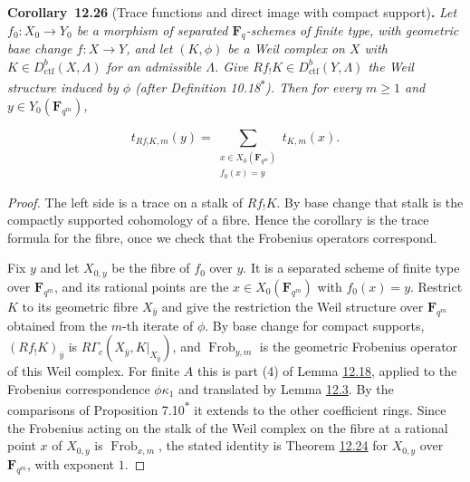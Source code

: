 \documentclass[11pt]{article}
\newenvironment{bpstatement}[2]{\par\addvspace{0.6\baselineskip}\noindent\textbf{#1}#2\textbf{.}\enspace\ignorespaces}
  {\par\addvspace{0.4\baselineskip}}
\newenvironment{bpstatementit}[2]{\begin{bpstatement}{#1}{#2}\itshape\ignorespaces}{\end{bpstatement}}
\newcommand{\bpout}[1]{#1\textsuperscript{\hyperlink{bp-outside}{\ensuremath{\ast}}}}
\begin{document}
\label{bp80}%
\begin{bpstatementit}{Corollary~12.26}{ (Trace functions and direct image with compact support)}
Let \(f_0:X_0\to Y_0\) be a morphism of separated \(\mathbf F_q\)-schemes of finite type, with geometric base change \(f:X\to Y\), and let \((K,\phi)\) be a Weil complex on \(X\) with \(K\in D^b_{\mathrm{ctf}}(X,\Lambda)\) for an admissible \(\Lambda\). Give \(Rf_!K\in D^b_{\mathrm{ctf}}(Y,\Lambda)\) the Weil structure induced by \(\phi\) (after Definition \bpout{10.18}). Then for every \(m\geq1\) and \(y\in Y_0(\mathbf F_{q^m})\),

\[
t_{Rf_!K,m}(y)=\sum_{\substack{x\in X_0(\mathbf F_{q^m})\\ f_0(x)=y}}
t_{K,m}(x).
\]
\end{bpstatementit}

\begin{proof}[{Proof}]\label{bp81}%
The left side is a trace on a stalk of \(Rf_!K\). By base change that stalk is the compactly supported cohomology of a fibre. Hence the corollary is the trace formula for the fibre, once we check that the Frobenius operators correspond.

Fix \(y\) and let \(X_{0,y}\) be the fibre of \(f_0\) over \(y\). It is a separated scheme of finite type over \(\mathbf F_{q^m}\), and its rational points are the \(x\in X_0(\mathbf F_{q^m})\) with \(f_0(x)=y\). Restrict \(K\) to its geometric fibre \(X_{\bar y}\) and give the restriction the Weil structure over \(\mathbf F_{q^m}\) obtained from the \(m\)-th iterate of \(\phi\). By base change for compact supports, \((Rf_!K)_{\bar y}\) is \(R\Gamma_c(X_{\bar y},K|_{X_{\bar y}})\), and \(\operatorname{Frob}_{y,m}\) is the geometric Frobenius operator of this Weil complex. For finite \(A\) this is part (4) of Lemma \hyperref[bp55]{12.18}, applied to the Frobenius correspondence \(\phi\kappa_1\) and translated by Lemma \hyperref[bp9]{12.3}. By the comparisons of Proposition \bpout{7.10} it extends to the other coefficient rings. Since the Frobenius acting on the stalk of the Weil complex on the fibre at a rational point \(x\) of \(X_{0,y}\) is \(\operatorname{Frob}_{x,m}\), the stated identity is Theorem \hyperref[bp73]{12.24} for \(X_{0,y}\) over \(\mathbf F_{q^m}\), with exponent \(1\).
\end{proof}
\end{document}
